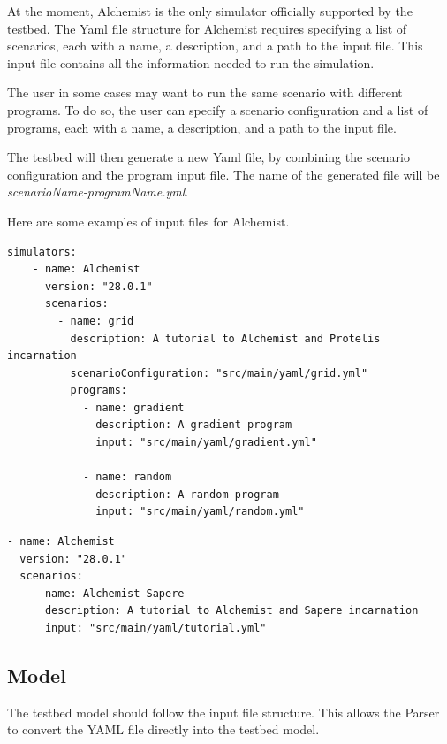 \documentclass[12pt,a4paper,openright,twoside]{book}
\begin{document}
At the moment, Alchemist is the only simulator officially supported by the testbed.
The Yaml file structure for Alchemist requires specifying a list of scenarios, each with a name, a description, and a path to the input file.
This input file contains all the information needed to run the simulation.

The user in some cases may want to run the same scenario with different programs.
To do so, the user can specify a scenario configuration and a list of programs, each with a name, a description, and a path to the input file.

The testbed will then generate a new Yaml file, by combining the scenario configuration and the program input file. 
The name of the generated file will be \textit{scenarioName-programName.yml}.

Here are some examples of input files for Alchemist.

\begin{lstlisting}[style=yaml, caption={Two programs to be tested in the same scenario}]
  simulators:
    - name: Alchemist
      version: "28.0.1"
      scenarios:
        - name: grid
          description: A tutorial to Alchemist and Protelis incarnation
          scenarioConfiguration: "src/main/yaml/grid.yml"
          programs:
            - name: gradient
              description: A gradient program
              input: "src/main/yaml/gradient.yml"
  
            - name: random
              description: A random program
              input: "src/main/yaml/random.yml"
  \end{lstlisting}

\begin{lstlisting}[style=yaml, caption={One scenario and one program. Both specified in the same input file.}]
- name: Alchemist
  version: "28.0.1"
  scenarios:
    - name: Alchemist-Sapere
      description: A tutorial to Alchemist and Sapere incarnation
      input: "src/main/yaml/tutorial.yml"
\end{lstlisting}

\subsection{Model}
The testbed model should follow the input file structure. 
This allows the Parser to convert the YAML file directly into the testbed model.
\end{document}
